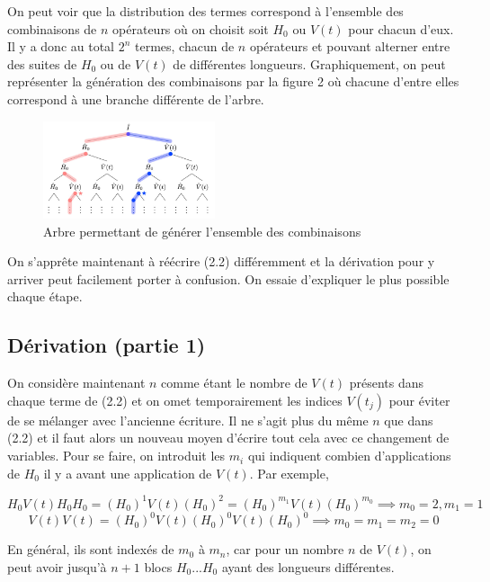On peut voir que la distribution des termes correspond à l'ensemble des combinaisons de $n$ opérateurs où on choisit soit $H_0$ ou $V(t)$ pour chacun d'eux. Il y a donc au total $2^n$ termes, chacun de $n$ opérateurs et pouvant alterner entre des suites de $H_0$ ou de $V(t)$ de différentes longueurs. Graphiquement, on peut représenter la génération des combinaisons par la figure 2 où chacune d'entre elles correspond à une branche différente de l'arbre.

\begin{figure}[H]
    \centering
     \includegraphics[width=0.45\textwidth]{images/ch2/embranchements.png}
    \caption{Arbre permettant de générer l'ensemble des combinaisons}
\end{figure}

On s'apprête maintenant à réécrire (2.2) différemment et la dérivation pour y arriver peut facilement porter à confusion. On essaie d'expliquer le plus possible chaque étape.

\subsection{Dérivation (partie 1)}
On considère maintenant $n$ comme étant le nombre de $V(t)$ présents dans chaque terme de (2.2) et on omet temporairement les indices $V(t_j)$ pour éviter de se mélanger avec l'ancienne écriture. Il ne s'agit plus du même $n$ que dans (2.2) et il faut alors un nouveau moyen d'écrire tout cela avec ce changement de variables. Pour se faire, on introduit les $m_i$ qui indiquent combien d'applications de $H_0$ il y a avant une application de $V(t)$. Par exemple,

\begin{equation*}
    H_0V(t)H_0H_0 = (H_0)^1V(t)(H_0)^2 = (H_0)^{m_1}V(t)(H_0)^{m_0} \implies m_0 = 2, m_1 = 1
\end{equation*}
\begin{equation*}
    V(t)V(t) = (H_0)^0V(t)(H_0)^0V(t)(H_0)^0 \implies m_0 = m_1 = m_2 = 0
\end{equation*}

En général, ils sont indexés de $m_0$ à $m_n$, car pour un nombre $n$ de $V(t)$, on peut avoir jusqu'à $n+1$ blocs $H_0...H_0$ ayant des longueurs différentes.

